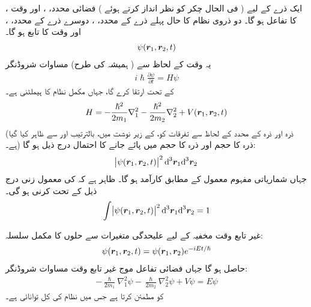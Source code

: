ایک ذرے کے لیے ( فی الحال چکر کو نظر انداز کرتے ہوئے )  فضائی محدد، ، اور وقت ، کا تفاعل ہو گا۔ دو ذروی نظام کا حال پہلے ذرے کے محدد، ، دوسرے ذرے کے محدد، ، اور وقت کا تابع ہو گا۔ 
\begin{align} 
\psi ( {{\boldsymbol{r}}}_1 , {{\boldsymbol{r}}}_2 , t ) 
\end{align}
 یہ وقت کے لحاظ سے ( ہمیشہ کی طرح) مساوات شروڈنگر 
\begin{align}
i \hslash \frac{ \partial \psi }{ \partial t } = H \psi
\end{align}
کے تحت ارتقا کرے گا، جہاں  مکمل نظام کا ہیملٹنی ہے۔
\begin{equation}
H = - \frac{ \hslash^2 }{ 2 m_1 } \nabla_1^2 - \frac{ \hslash^2 }{ 2 m_2 } \nabla_2^2 + V({{\boldsymbol{r}}}_1 , {{\boldsymbol{r}}}_2 , t )
\end{equation}
(ذرہ  اور ذرہ  کے محدد کے لحاظ سے تفرقات کو،  کے زیر نوشت میں، بالترتیب  اور  سے ظاہر کیا گیا ہے۔) ذرہ  کا
 حجم  اور ذرہ  کا حجم  میں پائے جانے کا احتمال درج ذیل ہو گا:
\begin{align}
\abs{\psi (\kvec{r}_1 , \kvec{r}_2 , t ) }^2 {\dif^{\,3} } { \kvec{r}_1 } {\dif^{\,3} } { \kvec{r}_2 }
\end{align}
جہاں شماریاتی مفہوم معمول کے مطابق کارآمد ہو گا۔ ظاہر ہے کہ  کی معمول زنی درج ذیل کے تحت کرنی ہو گی۔ 
\begin{align}
\int \abs{\psi ( \kvec{r}_1 , \kvec{r}_2 , t ) }^2 {\dif^{\,3} } {\kvec{r}_1 } {\dif^{\,3} } { \kvec{r}_2 } = 1
\end{align}

غیر تابع وقت مخفیہ کے لیے علیحدگی متغیرات سے حلوں کا مکمل سلسلہ:
\begin{align}
\psi ( {{\boldsymbol{r}}}_1 , {{\boldsymbol{r}}}_2 , t ) = \psi ( {{\boldsymbol{r}}}_1 , {{\boldsymbol{r}}}_2 ) {e}^{-i E t/\hslash} 
\end{align}
حاصل ہو گا جہاں فضائی تفاعل موج  غیر تابع وقت مساوات شروڈنگر:
\begin{align}
-\frac{ \hslash }{ 2 m_1 } {\nabla_1^2} { \psi } - \frac{ \hslash }{ 2 m_2 } \nabla_2^2 { \psi } + V \psi =E\psi
\end{align}
کو مطمئن کرتا ہے جس میں  نظام کی کل توانائی ہے۔ 

